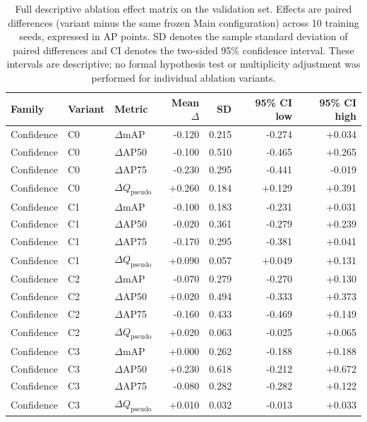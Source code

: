 \begin{table}[htbp]
\centering
\caption{Full descriptive ablation effect matrix on the validation set. Effects are paired differences (variant minus the same frozen Main configuration) across 10 training seeds, expressed in AP points. SD denotes the sample standard deviation of paired differences and CI denotes the two-sided 95\% confidence interval. These intervals are descriptive; no formal hypothesis test or multiplicity adjustment was performed for individual ablation variants.}
\label{tab:supp_ablation_full_matrix}
\small
\setlength{\tabcolsep}{4pt}
\renewcommand{\arraystretch}{1.06}
\begin{tabular}{lllrrrr}
\toprule
\textbf{Family} & \textbf{Variant} & \textbf{Metric} & \textbf{Mean $\Delta$} & \textbf{SD} & \textbf{95\% CI low} & \textbf{95\% CI high} \\
\midrule
Confidence & C0 & $\Delta$mAP & -0.120 & 0.215 & -0.274 & +0.034 \\
Confidence & C0 & $\Delta$AP50 & -0.100 & 0.510 & -0.465 & +0.265 \\
Confidence & C0 & $\Delta$AP75 & -0.230 & 0.295 & -0.441 & -0.019 \\
Confidence & C0 & $\Delta Q_{\mathrm{pseudo}}$ & +0.260 & 0.184 & +0.129 & +0.391 \\
Confidence & C1 & $\Delta$mAP & -0.100 & 0.183 & -0.231 & +0.031 \\
Confidence & C1 & $\Delta$AP50 & -0.020 & 0.361 & -0.279 & +0.239 \\
Confidence & C1 & $\Delta$AP75 & -0.170 & 0.295 & -0.381 & +0.041 \\
Confidence & C1 & $\Delta Q_{\mathrm{pseudo}}$ & +0.090 & 0.057 & +0.049 & +0.131 \\
Confidence & C2 & $\Delta$mAP & -0.070 & 0.279 & -0.270 & +0.130 \\
Confidence & C2 & $\Delta$AP50 & +0.020 & 0.494 & -0.333 & +0.373 \\
Confidence & C2 & $\Delta$AP75 & -0.160 & 0.433 & -0.469 & +0.149 \\
Confidence & C2 & $\Delta Q_{\mathrm{pseudo}}$ & +0.020 & 0.063 & -0.025 & +0.065 \\
Confidence & C3 & $\Delta$mAP & +0.000 & 0.262 & -0.188 & +0.188 \\
Confidence & C3 & $\Delta$AP50 & +0.230 & 0.618 & -0.212 & +0.672 \\
Confidence & C3 & $\Delta$AP75 & -0.080 & 0.282 & -0.282 & +0.122 \\
Confidence & C3 & $\Delta Q_{\mathrm{pseudo}}$ & +0.010 & 0.032 & -0.013 & +0.033 \\

\end{tabular}
\end{table}
